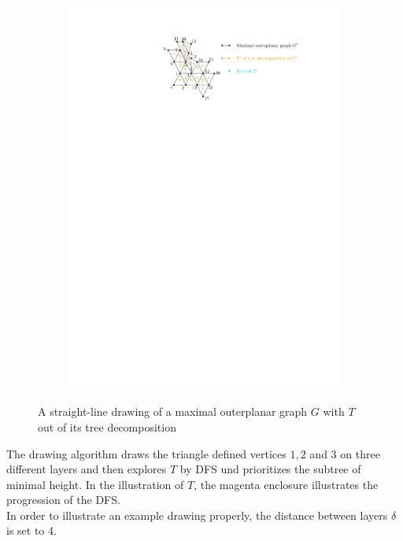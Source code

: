 \begin{figure}[H]
	\centering
	\begin{subfigure}{\textwidth}
		\centering
		\includegraphics[page=1,width=0.9\linewidth]{graphics/maximal_outerplanar_example_drawings.pdf}
	\end{subfigure}
	\caption{A straight-line drawing of a maximal outerplanar graph $G$ with $T$ out of its tree decomposition}\label{im:maximal_outerplanar_example_straight-line}
\end{figure}
The drawing algorithm draws the triangle defined vertices $1,2$ and $3$ on three different layers and then explores $T$ by DFS und prioritizes the subtree of minimal height. In the illustration of $T$, the magenta enclosure illustrates the progression of the DFS.\\
In order to illustrate an example drawing properly, the distance between layers $\delta$ is set to 4.
